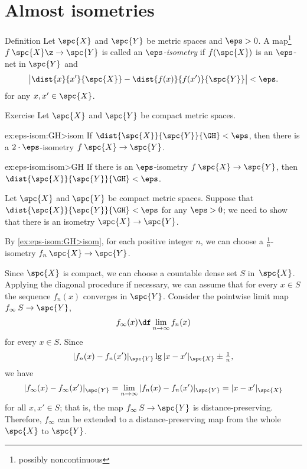 \section{Almost isometries}\label{sec:alm-isom}

\begin{thm}{Definition} Let $\spc{X}$ and $\spc{Y}$ be metric spaces and $\eps>0$. 
A  map\footnote{possibly noncontinuous} $f\: \spc{X} \z\to \spc{Y}$ is called an \emph{$\eps$-isometry} 
if $f(\spc{X})$ is an $\eps$-net in $\spc{Y}$ and
\[\bigl|\dist{x}{x'}{\spc{X}}-\dist{f(x)}{f(x')}{\spc{Y}}\bigr|<\eps.\]
for any $x,x'\in \spc{X}$.
\end{thm}

\begin{thm}{Exercise}\label{ex:eps-isom}
Let $\spc{X}$ and $\spc{Y}$ be compact metric spaces.

\begin{subthm}{ex:eps-isom:GH>isom}
If $\dist{\spc{X}}{\spc{Y}}{\GH}<\eps$, then there is a $2\cdot\eps$-isometry $f\:\spc{X}\to\spc{Y}$.
\end{subthm}

\begin{subthm}{ex:eps-isom:isom>GH}
If there is an $\eps$-isometry $f\:\spc{X}\to\spc{Y}$, then $\dist{\spc{X}}{\spc{Y}}{\GH}<\eps$.
\end{subthm}

\end{thm}

\label{page:GH-2-proof}
Let $\spc{X}$ and $\spc{Y}$ be compact metric spaces.
Suppose that $\dist{\spc{X}}{\spc{Y}}{\GH}<\eps$ for any $\eps>0$;
we need to show that there is an isometry $\spc{X}\to\spc{Y}$.

By \ref{ex:eps-isom:GH>isom}, for each positive integer $n$, we can choose a $\tfrac1n$-isometry $f_n\:\spc{X}\to\spc{Y}$.

Since $\spc{X}$ is compact, 
we can choose a countable dense set
$S$ in~$\spc{X}$.
Applying the diagonal procedure if necessary, we can assume that for every $x \in S$ the sequence $f_n(x)$ 
converges in $\spc{Y}$. 
Consider the pointwise limit map  $f_\infty \: S \to \spc{Y}$,
 $$f_\infty(x) \df \lim_{n\to\infty} f_n (x)$$ for every $x \in S$. 
Since $$|f_n (x)- f_n (x')|_{\spc{Y}}\lg |x- x'|_\spc{X} \pm\tfrac1n,$$ 
we have 
$$|f_\infty(x)-f_\infty (x')|_{\spc{Y}} 
= \lim_{n\to\infty} |f_n(x)-f_n (x')|_{\spc{Y}} 
= |x -x'|_\spc{X}$$ for all
$x, x' \in S$; 
that is, the map $f_\infty\:S\to \spc{Y}$ is distance-preserving. 
Therefore, $f_\infty$ can be extended to a distance-preserving map from the whole $\spc{X}$ to $\spc{Y}$.


